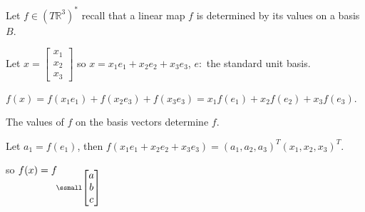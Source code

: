 \documentclass[12pt]{article}
\newcommand{\mR}{{\mathbb{R}}}
\begin{document}
		Let $f \in (T\mR^3)^*$ recall that a linear map $f$ is determined by 
		its values on a basis $B$. 

		Let $x = \begin{bmatrix}
			x_1\\
			x_2\\
			x_3
		\end{bmatrix}$ so $x = x_1e_1+x_2e_2+x_3e_3$, $e:$ the standard unit basis.
		
		$f(x) = f(x_1e_1)+f(x_2e_3)+f(x_3e_3) = x_1f(e_1)+x_2f(e_2)+x_3f(e_3)$.

		The values of $f$ on the basis vectors determine $f$.

		Let $a_1 = f(e_1)$, then $f(x_1e_1 + x_2e_2 + x_3e_3) = 
		(a_1,a_2,a_3)^T(x_1,x_2,x_3)^T$.

		so $f(x) = f_{\ssmall\begin{bmatrix}
				a\\
				b\\
				c
			\end{bmatrix}}$





	\newpage
\end{document}
